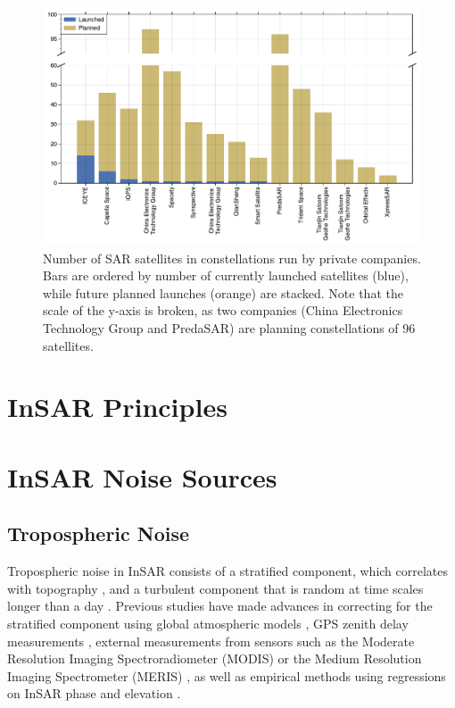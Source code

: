 \documentclass{utexasthesis}
\begin{document}
\begin{figure}[!htbp]
	\centering
	\includegraphics[width=1.0\textwidth]{figures/chapter3-sar/sar-private-constellations.pdf}
	\caption[Private sector SAR constellations]{Number of SAR satellites in constellations run by private companies. Bars are ordered by number of currently launched satellites (blue), while future planned launches (orange) are stacked. Note that the scale of the y-axis is broken, as two companies (China Electronics Technology Group and PredaSAR) are planning constellations of 96 satellites.
	}
	\label{fig:sar-private-const}
\end{figure}



\section{InSAR Principles}




\section{InSAR Noise Sources}
\label{sec:ch3-noise}

\subsection{Tropospheric Noise}
\label{sec:ch3-noise-tropo}

Tropospheric noise in InSAR consists of a stratified component, which correlates with topography \citep{Doin2009CorrectionsStratifiedTropospheric}, and a turbulent component that is random at time scales longer than a day \citep{Emardson2003NeutralAtmosphericDelay, Onn2006ModelingWaterVapor}. Previous studies have made advances in correcting for the stratified component using global atmospheric models \citep{Doin2009CorrectionsStratifiedTropospheric, Jolivet2014ImprovingInsarGeodesy, Cao2021AdvancedInsarTropospheric}, GPS zenith delay measurements \citep{Onn2006ModelingWaterVapor}, external measurements from sensors such as the Moderate Resolution Imaging Spectroradiometer (MODIS) \citep{Li2005InterferometricSyntheticAperture, Barnhart2013CharacterizingEstimatingNoise} or the Medium Resolution Imaging Spectrometer (MERIS)  \citep{Ding2008AtmosphericEffectsInsar}, as well as empirical methods using regressions on InSAR phase and elevation \citep{Zebker2021AccuracyModelFree, Murray2021ClusterBasedEmpirical}.
\end{document}
